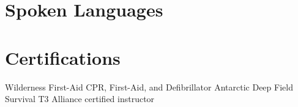 \documentclass[a4paper,12pt,sans,colorlinks]{moderncv}
\begin{document}
\section{Spoken Languages}


\section{Certifications}

{
    Wilderness First-Aid
}
{
    CPR, First-Aid, and Defibrillator
}
{
    Antarctic Deep Field Survival
}
{
    T3 Alliance certified instructor
}
\end{document}
